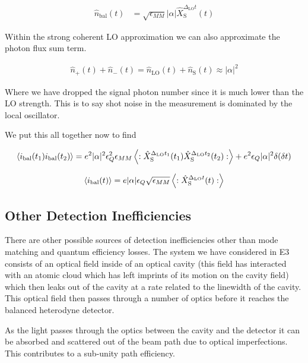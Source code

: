 \documentclass[12pt]{article}
\begin{document}
\begin{align}
\hat{n}_{\text{bal}}(t) &= \sqrt{\epsilon_{MM}}|\alpha|\hat{X}_{\text{S}}^{\Delta_{\text{LO}}t}(t)
\end{align}

Within the strong coherent LO approximation we can also approximate the photon flux sum term.

\begin{align}
\hat{n}_+(t) + \hat{n}_-(t) = \hat{n}_{\text{LO}}(t) + \hat{n}_{\text{S}}(t) \approx |\alpha|^2
\end{align}

Where we have dropped the signal photon number since it is much lower than the LO strength. This is to say shot noise in the measurement is dominated by the local oscillator.

We put this all together now to find

\begin{align}
\Braket{i_{\text{bal}}(t_1)i_{\text{bal}}(t_2)} = e^2 |\alpha|^2 \epsilon_Q^2 \epsilon_{MM} \Braket{:\hat{X}_{\text{S}}^{\Delta_{\text{LO}}t_1}(t_1)\hat{X}_{\text{S}}^{\Delta_{\text{LO}}t_2}(t_2) :} + e^2 \epsilon_Q |\alpha|^2 \delta(\delta t)
\end{align}

\begin{align}
\Braket{i_{\text{bal}}(t)} = e |\alpha| \epsilon_Q \sqrt{\epsilon_{MM}} \Braket{:\hat{X}^{\Delta_{\text{LO}}t}_{\text{S}}(t):}
\end{align}

\subsection{Other Detection Inefficiencies}

There are other possible sources of detection inefficiencies other than mode matching and quantum efficiency losses. The system we have considered in E3 consists of an optical field inside of an optical cavity (this field has interacted with an atomic cloud which has left imprints of its motion on the cavity field) which then leaks out of the cavity at a rate related to the linewidth of the cavity. This optical field then passes through a number of optics before it reaches the balanced heterodyne detector.

As the light passes through the optics between the cavity and the detector it can be absorbed and scattered out of the beam path due to optical imperfections. This contributes to a sub-unity path efficiency.
\end{document}
